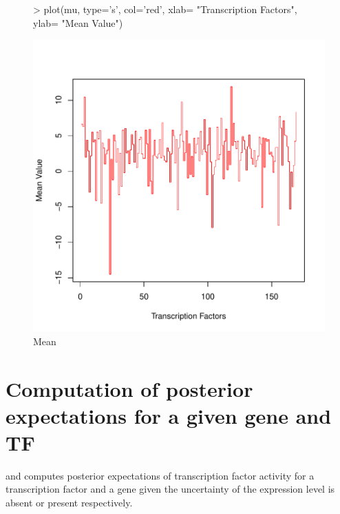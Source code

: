 \documentclass{article}
\begin{document}
\begin{figure}
\begin{Schunk}
\begin{Sinput}
> plot(mu, type='s', col='red', xlab= "Transcription Factors", ylab= "Mean Value")
\end{Sinput}
\end{Schunk}
\includegraphics{chipDyno-figure1}
\caption{Mean}
\label{valMin}
\end{figure}


\section{Computation of posterior expectations for a given gene and TF}
 and  computes posterior expectations of transcription factor activity for a transcription factor and a gene given the uncertainty of the expression level is absent or present respectively.
\end{document}
